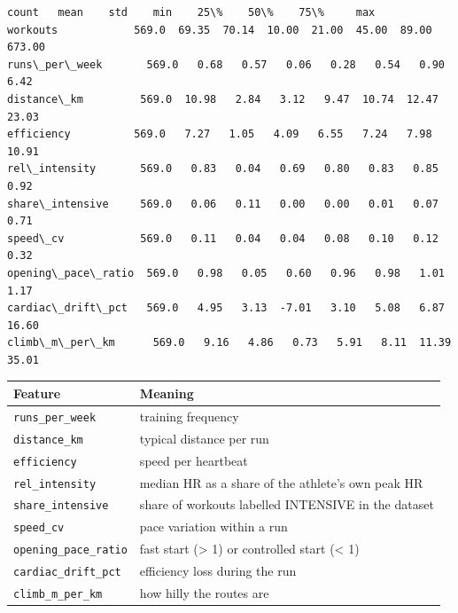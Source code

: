 \documentclass[11pt]{article}
\makeatletter
\newcommand{\boxspacing}{\kern\kvtcb@left@rule\kern\kvtcb@boxsep}
\newcommand{\prompt}[4]{
        {\ttfamily\llap{{\color{#2}[#3]:\hspace{3pt}#4}}\vspace{-\baselineskip}}
    }
\makeatother
\begin{document}
            \begin{tcolorbox}[breakable, size=fbox, boxrule=.5pt, pad at break*=1mm, opacityfill=0]
\prompt{Out}{outcolor}{2}{\boxspacing}
\begin{Verbatim}[commandchars=\\\{\}]
                    count   mean    std    min    25\%    50\%    75\%     max
workouts            569.0  69.35  70.14  10.00  21.00  45.00  89.00  673.00
runs\_per\_week       569.0   0.68   0.57   0.06   0.28   0.54   0.90    6.42
distance\_km         569.0  10.98   2.84   3.12   9.47  10.74  12.47   23.03
efficiency          569.0   7.27   1.05   4.09   6.55   7.24   7.98   10.91
rel\_intensity       569.0   0.83   0.04   0.69   0.80   0.83   0.85    0.92
share\_intensive     569.0   0.06   0.11   0.00   0.00   0.01   0.07    0.71
speed\_cv            569.0   0.11   0.04   0.04   0.08   0.10   0.12    0.32
opening\_pace\_ratio  569.0   0.98   0.05   0.60   0.96   0.98   1.01    1.17
cardiac\_drift\_pct   569.0   4.95   3.13  -7.01   3.10   5.08   6.87   16.60
climb\_m\_per\_km      569.0   9.16   4.86   0.73   5.91   8.11  11.39   35.01
\end{Verbatim}
\end{tcolorbox}
        
    {\def\LTcaptype{none} %
\begin{longtable}[]{@{}
  >{\raggedright\arraybackslash}p{}
  >{\raggedright\arraybackslash}p{}@{}}
\toprule\noalign{}
\begin{minipage}[b]{\linewidth}\raggedright
Feature
\end{minipage} & \begin{minipage}[b]{\linewidth}\raggedright
Meaning
\end{minipage} \\
\midrule\noalign{}
\endhead
\bottomrule\noalign{}
\endlastfoot
\texttt{runs\_per\_week} & training frequency \\
\texttt{distance\_km} & typical distance per run \\
\texttt{efficiency} & speed per heartbeat \\
\texttt{rel\_intensity} & median HR as a share of the athlete's own peak
HR \\
\texttt{share\_intensive} & share of workouts labelled INTENSIVE in the
dataset \\
\texttt{speed\_cv} & pace variation within a run \\
\texttt{opening\_pace\_ratio} & fast start (\textgreater{} 1) or
controlled start (\textless{} 1) \\
\texttt{cardiac\_drift\_pct} & efficiency loss during the run \\
\texttt{climb\_m\_per\_km} & how hilly the routes are \\
\end{longtable}
}
\end{document}
